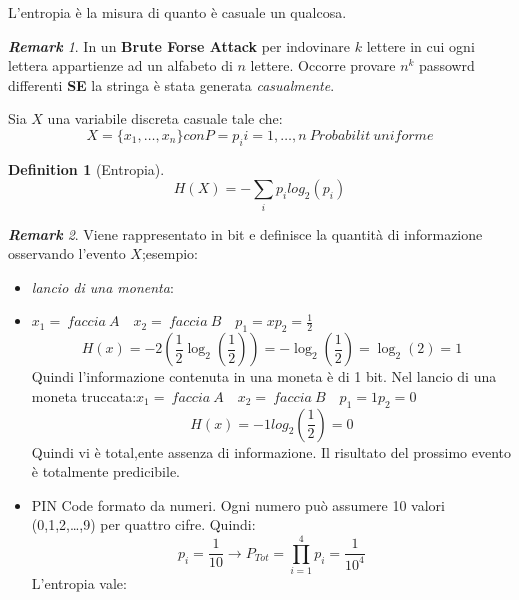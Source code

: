 \documentclass{book}
\newtheorem{definition}{Definition}[section]
\theoremstyle{remark}
\newtheorem*{remark}{\textbf{Remark}}
\begin{document}
\begin{enumerate}
	      L'entropia è la misura di quanto è casuale un qualcosa\@.
	      \begin{remark}
		      In un \textbf{Brute Forse Attack} per indovinare \(k\) lettere in cui ogni lettera appartienze ad un alfabeto di \(n\) lettere\@. Occorre provare \(n^k\) passowrd differenti \textbf{SE} la stringa è stata generata \emph{casualmente}\@.
	      \end{remark}
	      Sia \(X\) una variabile discreta casuale tale che:\begin{equation*}
		      X=\{x_1,\dots ,x_n\} con P=p_i  i=1,\dots ,n\ Probabilit\ uniforme
	      \end{equation*}
	      \begin{definition}[Entropia]
		      \begin{equation*}
			      H(X)=-\sum_ip_ilog_2(p_i)
		      \end{equation*}
	      \end{definition}
	      \begin{remark}
		      Viene rappresentato in bit e definisce la quantità di informazione osservando l'evento \(X\);\@Per esempio:\begin{itemize}
			      \item \emph{lancio di una monenta}:
			      \item \(x_1=\ faccia\ A\quad x_2=\ faccia\ B\quad p_1=xp_2=\frac{1}{2}\)\begin{equation*}
				            H(x)=-2(\frac{1}{2}\log_{2}{(\frac{1}{2})})=-\log_{2}{(\frac{1}{2})}=\log_{2}{(2)}=1
			            \end{equation*}
			            Quindi l'informazione contenuta in una moneta è di 1 bit\@.
			            Nel lancio di una moneta truccata:\(x_1=\ faccia\ A\quad x_2=\ faccia\ B\quad p_1=1 p_2=0\)\begin{equation*}
				            H(x)=-1log_2(\frac{1}{2})=0
			            \end{equation*}
			            Quindi vi è total,ente assenza di informazione\@. Il risultato del prossimo evento è totalmente predicibile\@.
			      \item PIN Code formato da numeri\@. Ogni numero può assumere 10 valori (0,1,2,\dots,9) per quattro cifre\@. Quindi:\begin{equation*}
				            p_i=\frac{1}{10}\rightarrow P_{Tot}=\prod_{i=1}^{4}p_i=\frac{1}{10^4}
			            \end{equation*}
			            L'entropia vale:\begin{equation*}

\end{equation*}
\end{itemize}
\end{remark}
\end{enumerate}
\end{document}
